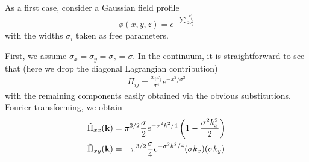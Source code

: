 \documentclass{revtex4}
\begin{document}
As a first case, consider a Gaussian field profile
\begin{equation}
  \phi(x,y,z) = e^{-\sum\frac{x_i^2}{2\sigma_i^2}}
\end{equation}
with the widths $\sigma_i$ taken as free parameters.

First, we assume $\sigma_x=\sigma_y=\sigma_z=\sigma$.
In the continuum, it is straightforward to see that (here we drop the diagonal Lagrangian contribution)
\begin{subequations}
\begin{align}
  \Pi_{ij} = \frac{x_ix_j}{\sigma^4}e^{-x^2/\sigma^2}
\end{align}
\end{subequations}
with the remaining components easily obtained via the obvious substitutions.
Fourier transforming, we obtain
\begin{align}
  \tilde{\Pi}_{xx}({\bf k}) &= \pi^{3/2}\frac{\sigma}{2}e^{-\sigma^2k^2/4}\left(1-\frac{\sigma^2k_x^2}{2}\right) \\
  \tilde{\Pi}_{xy}({\bf k}) &= -\pi^{3/2}\frac{\sigma}{4}e^{-\sigma^2k^2/4}(\sigma k_x)(\sigma k_y)
\end{align}
\end{document}
